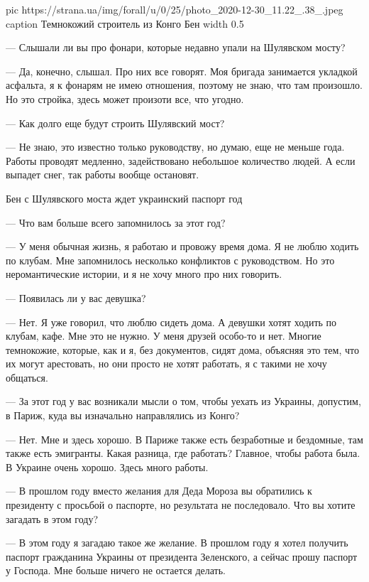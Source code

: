 \ifcmt
  pic https://strana.ua/img/forall/u/0/25/photo_2020-12-30_11.22_.38_.jpeg
	caption Темнокожий строитель из Конго Бен
  width 0.5
\fi


— Слышали ли вы про фонари, которые недавно упали на Шулявском мосту? 

— Да, конечно, слышал. Про них все говорят. Моя бригада занимается
укладкой асфальта, я к фонарям не имею отношения, поэтому не знаю, что там
произошло. Но это стройка, здесь может произоти все, что угодно.  

— Как долго еще будут строить Шулявский мост? 

— Не знаю, это известно только руководству, но думаю, еще не меньше года.
Работы проводят медленно, задействовано небольшое количество людей. А если
выпадет снег, так работы вообще остановят.  

Бен с Шулявского моста ждет украинский паспорт год

— Что вам больше всего запомнилось за этот год? 

— У меня обычная жизнь, я работаю и провожу время дома. Я не люблю ходить
по клубам. Мне запомнилось несколько конфликтов с руководством. Но
это неромантические истории, и я не хочу много про них говорить.  

— Появилась ли у вас девушка? 

— Нет. Я уже говорил, что люблю сидеть дома. А девушки хотят ходить по
клубам, кафе. Мне это не нужно. У меня друзей особо-то и нет. Многие
темнокожие, которые, как и я, без документов, сидят дома, объясняя это
тем, что их могут арестовать, но они просто не хотят работать, я с такими
не хочу общаться.  

— За этот год у вас возникали мысли о том, чтобы уехать из Украины,
допустим, в Париж, куда вы изначально направлялись из Конго? 

— Нет. Мне и здесь хорошо. В Париже также есть безработные и бездомные,
там также есть эмигранты. Какая разница, где работать? Главное, чтобы
работа была. В Украине очень хорошо. Здесь много работы. 

— В прошлом году вместо желания для Деда Мороза вы обратились к президенту
с просьбой о паспорте, но результата не последовало. Что вы хотите
загадать в этом году? 

— В этом году я загадаю такое же желание. В прошлом году я хотел получить
паспорт гражданина Украины от президента Зеленского, а сейчас прошу
паспорт у Господа. Мне больше ничего не остается делать.


